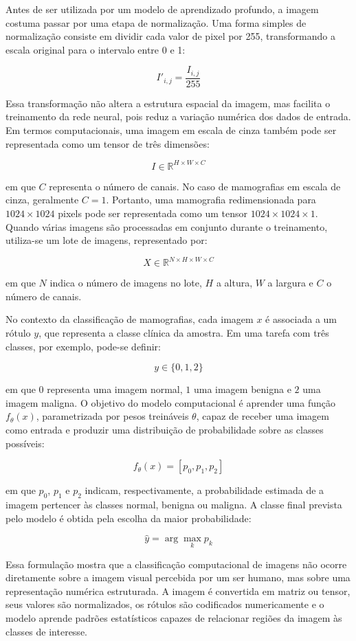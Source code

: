 \documentclass[
    12pt,
    openright,
    oneside,
    a4paper,
    english,
    brazil
]{abntex2}
\begin{document}
Antes de ser utilizada por um modelo de aprendizado profundo, a imagem costuma passar por uma etapa de normalização. Uma forma simples de normalização consiste em dividir cada valor de pixel por 255, transformando a escala original para o intervalo entre 0 e 1:

\[
I'_{i,j} = \frac{I_{i,j}}{255}
\]

Essa transformação não altera a estrutura espacial da imagem, mas facilita o treinamento da rede neural, pois reduz a variação numérica dos dados de entrada. Em termos computacionais, uma imagem em escala de cinza também pode ser representada como um tensor de três dimensões:

\[
I \in \mathbb{R}^{H \times W \times C}
\]

em que \(C\) representa o número de canais. No caso de mamografias em escala de cinza, geralmente \(C = 1\). Portanto, uma mamografia redimensionada para \(1024 \times 1024\) pixels pode ser representada como um tensor \(1024 \times 1024 \times 1\). Quando várias imagens são processadas em conjunto durante o treinamento, utiliza-se um lote de imagens, representado por:

\[
X \in \mathbb{R}^{N \times H \times W \times C}
\]

em que \(N\) indica o número de imagens no lote, \(H\) a altura, \(W\) a largura e \(C\) o número de canais.

No contexto da classificação de mamografias, cada imagem \(x\) é associada a um rótulo \(y\), que representa a classe clínica da amostra. Em uma tarefa com três classes, por exemplo, pode-se definir:

\[
y \in \{0, 1, 2\}
\]

em que \(0\) representa uma imagem normal, \(1\) uma imagem benigna e \(2\) uma imagem maligna. O objetivo do modelo computacional é aprender uma função \(f_{\theta}(x)\), parametrizada por pesos treináveis \(\theta\), capaz de receber uma imagem como entrada e produzir uma distribuição de probabilidade sobre as classes possíveis:

\[
f_{\theta}(x) = [p_0, p_1, p_2]
\]

em que \(p_0\), \(p_1\) e \(p_2\) indicam, respectivamente, a probabilidade estimada de a imagem pertencer às classes normal, benigna ou maligna. A classe final prevista pelo modelo é obtida pela escolha da maior probabilidade:

\[
\hat{y} = \arg\max_{k} p_k
\]

Essa formulação mostra que a classificação computacional de imagens não ocorre diretamente sobre a imagem visual percebida por um ser humano, mas sobre uma representação numérica estruturada. A imagem é convertida em matriz ou tensor, seus valores são normalizados, os rótulos são codificados numericamente e o modelo aprende padrões estatísticos capazes de relacionar regiões da imagem às classes de interesse.
\end{document}
